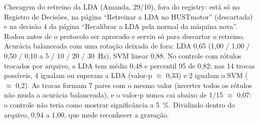 \begin{table}[H]
\smallskip
\parbox{\textwidth}{\footnotesize Checagem do retreino da LDA (Amanda, 29/10), fora do registry: está só no Registro de Decisões, na página ``Retreinar a LDA no HUSTmotor'' (descartada) e na decisão 4 da página ``Recalibrar a LDA pela normal da máquina nova''. Rodou antes de o protocolo ser aprovado e serviu só para descartar o retreino. Acurácia balanceada com uma rotação deixada de fora: LDA 0,65 (1,00 / 1,00 / 0,50 / 0,10 a 5 / 10 / 20 / 30~Hz), SVM linear 0,88. No controle com rótulos trocados por arquivo, a LDA tem média 0,48 e percentil 95 de 0,82; nas 14 trocas possíveis, 4 igualam ou superam a LDA (valor-p $\approx$ 0,33) e 2 igualam o SVM ($\approx$ 0,2). As trocas formam 7 pares com o mesmo valor (inverter todos os rótulos não muda a acurácia balanceada), e o valor-p nunca cai abaixo de 1/15 $\approx$ 0,07: o controle não teria como mostrar significância a 5~\%. Dividindo dentro do arquivo, 0,94 a 1,00, que mede reconhecer a gravação.}
\end{table}
